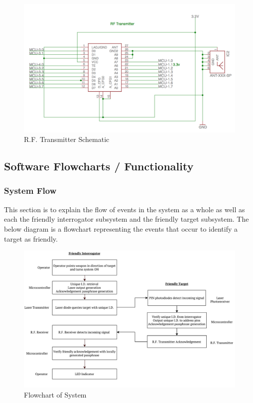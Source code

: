 \documentclass[letterpaper,10pt]{article}
\begin{document}
\begin{spacing}{1.15}
\begin{figure} [H]
	\centering
	\includegraphics[scale=0.53]{RFTransmitter.png}
	\caption{R.F. Transmitter Schematic\label{fig:photoreceiver-schematic}}
\end{figure}

\subsection{Software Flowcharts / Functionality} \label{section-software}
\subsubsection{System Flow}
This section is to explain the flow of events in the system as a whole as well as each the friendly interrogator subsystem and the friendly target subsystem. The below diagram is a flowchart representing the events that occur to identify a target as friendly.

\begin{figure} [H]
	\centering
	\includegraphics[scale=0.55]{Functionality_Flowchart.pdf}
	\caption{Flowchart of System\label{fig:circuit-schematic}}
\end{figure}


\end{spacing}
\end{document}
